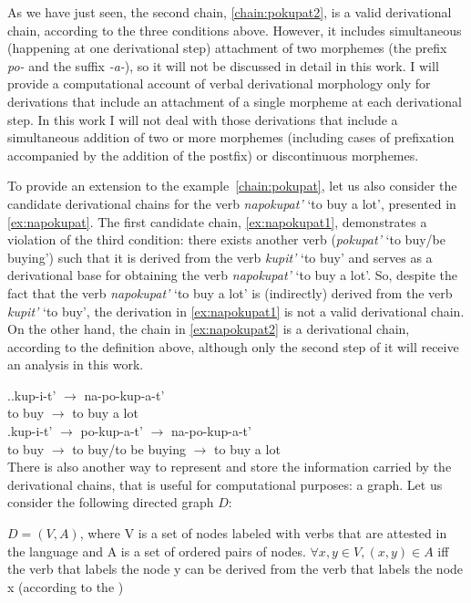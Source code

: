As we have just seen, the second chain, \ref{chain:pokupat2}, is a valid derivational chain, according to the three conditions above. However, it includes simultaneous (happening at one derivational step) attachment of two morphemes (the prefix \textit{po-} and the suffix \textit{-a-}), so it will not be discussed in detail in this work. I will provide a computational account of verbal derivational morphology only for derivations that include an attachment of a single morpheme at each derivational step. In this work I will not deal with those derivations that include a simultaneous addition of two or more morphemes (including cases of prefixation accompanied by the addition of the postfix) or discontinuous morphemes.

To provide an extension to the example~\ref{chain:pokupat}, let us also consider the candidate derivational chains for the verb \textit{napokupat'} `to buy a lot', presented in \ref{ex:napokupat}. The first candidate chain, \ref{ex:napokupat1}, demonstrates a violation of the third condition: there exists another verb (\textit{pokupat'} `to buy/be buying') such that it is derived from the verb \textit{kupit'} `to buy' and serves as a derivational base for obtaining the verb \textit{napokupat'} `to buy a lot'. So, despite the fact that the verb \textit{napokupat'} `to buy a lot' is (indirectly) derived from the verb \textit{kupit'} `to buy', the derivation in \ref{ex:napokupat1} is not a valid derivational chain. On the other hand, the chain in \ref{ex:napokupat2} is a derivational chain, according to the definition above, although only the second step of it will receive an analysis in this work. 

\ex.\label{ex:napokupat}\ag.\label{ex:napokupat1}kup-i-t'\textsuperscript{\PF} $\rightarrow$ na-po-kup-a-t'\textsuperscript{\PF}\\	
{to buy} $\rightarrow$ {to buy a lot}\\
\bg.\label{ex:napokupat2}kup-i-t'\textsuperscript{\PF} $\rightarrow$ po-kup-a-t'\textsuperscript{\IPF} $\rightarrow$ na-po-kup-a-t'\textsuperscript{\PF}\\
{to buy} $\rightarrow$ {to buy/to be buying} $\rightarrow$ {to buy a lot}\\

There is also another way to represent and store the information carried by the derivational chains, that is useful for computational purposes: a graph. Let us consider the following directed graph $D$: 
\begin{definition}\label{def:chain}
$D = (V,A)$, where V is a set of nodes labeled with verbs that are attested in the language and A is a set of ordered pairs of nodes. $\forall x,y \in V, (x,y) \in A$ iff  the verb that labels the node y can be derived from the verb that labels the node x (according to the )
\end{definition}

